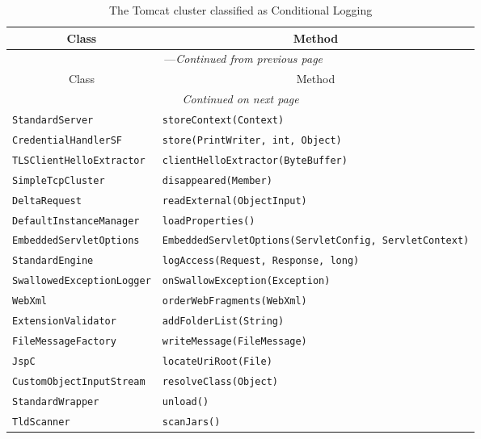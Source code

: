 \begin{center}
\begin{longtable}{ll}
\caption{The Tomcat cluster classified as Conditional Logging}\\
\toprule\multicolumn{1}{c}{Class}&\multicolumn{1}{c}{Method}\\\midrule
\endfirsthead

\multicolumn{2}{c}{\tablename\ \thetable{}---\textit{Continued from previous page}} \\\midrule
\multicolumn{1}{c}{Class}&\multicolumn{1}{c}{Method}\\\midrule
\endhead
\multicolumn{2}{c}{\textit{Continued on next page}}\\\midrule
\endfoot
\bottomrule
\endlastfoot
 \lstinline/StandardServer/&{\lstinline/storeContext(Context)/}\\
 \lstinline/CredentialHandlerSF/&{\lstinline/store(PrintWriter, int, Object)/}\\
 \lstinline/TLSClientHelloExtractor/&{\hspace*{-2pt}\lstinline/clientHelloExtractor(ByteBuffer)/}\\
 \lstinline/SimpleTcpCluster/&{\lstinline/disappeared(Member)/}\\
 \lstinline/DeltaRequest/&{\lstinline/readExternal(ObjectInput)/}\\
 \lstinline/DefaultInstanceManager/&{\lstinline/loadProperties()/}\\
 \lstinline/EmbeddedServletOptions/&{\lstinline/EmbeddedServletOptions(ServletConfig, ServletContext)/}\\
 \lstinline/StandardEngine/&{\lstinline/logAccess(Request, Response, long)/}\\
 \lstinline/SwallowedExceptionLogger/&{\lstinline/onSwallowException(Exception)/}\\
 \lstinline/WebXml/&{\lstinline/orderWebFragments(WebXml)/}\\
 \lstinline/ExtensionValidator/&{\lstinline/addFolderList(String)/}\\
 \lstinline/FileMessageFactory/&{\lstinline/writeMessage(FileMessage)/}\\
 \lstinline/JspC/&{\lstinline/locateUriRoot(File)/}\\
 \lstinline/CustomObjectInputStream/&{\lstinline/resolveClass(Object)/}\\
 \lstinline/StandardWrapper/&{\lstinline/unload()/}\\
 \lstinline/TldScanner/&{\lstinline/scanJars()/}\\

\end{longtable}
\end{center}

